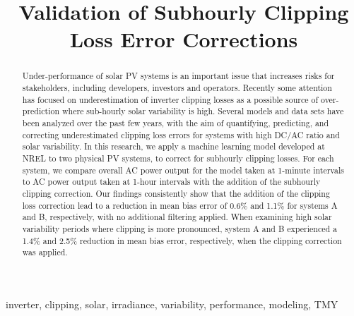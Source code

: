 \documentclass[conference]{IEEEtran}
\begin{document}
\title{Validation of Subhourly Clipping Loss Error Corrections}

\author{
    }

\maketitle

\begin{abstract}
Under-performance of solar PV systems is an important issue that increases risks for stakeholders, including developers, investors and operators. Recently some attention has focused on underestimation of inverter clipping losses as a possible source of over-prediction where sub-hourly solar variability is high. Several models and data sets have been analyzed over the past few years, with the aim of quantifying, predicting, and correcting underestimated clipping loss errors for systems with high DC/AC ratio and solar variability. In this research, we apply a machine learning model developed at NREL to two physical PV systems, to correct for subhourly clipping losses. For each system, we compare overall AC power output for the model taken at 1-minute intervals to AC power output taken at 1-hour intervals with the addition of the subhourly clipping correction. Our findings consistently show that the addition of the clipping loss correction lead to a reduction in mean bias error of 0.6\% and 1.1\% for systems A and B, respectively, with no additional filtering applied. When examining high solar variability periods where clipping is more pronounced, system A and B experienced a 1.4\% and 2.5\% reduction in mean bias error, respectively, when the clipping correction was applied.
\end{abstract}

\begin{IEEEkeywords}
inverter, clipping, solar, irradiance, variability, performance, modeling, TMY
\end{IEEEkeywords}
\end{document}
